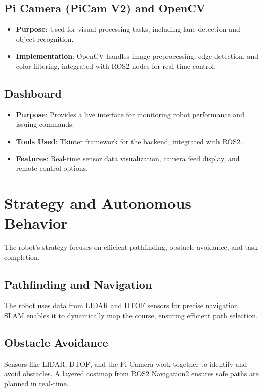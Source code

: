 \documentclass[12pt,a4paper]{article}
\begin{document}
\subsection{Pi Camera (PiCam V2) and OpenCV}
\begin{itemize}
    \item \textbf{Purpose}: Used for visual processing tasks, including lane detection and object recognition.
    \item \textbf{Implementation}: OpenCV handles image preprocessing, edge detection, and color filtering, integrated with ROS2 nodes for real-time control.
\end{itemize}

\subsection{Dashboard}
\begin{itemize}
    \item \textbf{Purpose}: Provides a live interface for monitoring robot performance and issuing commands.
    \item \textbf{Tools Used}: Tkinter framework for the backend, integrated with ROS2.
    \item \textbf{Features}: Real-time sensor data visualization, camera feed display, and remote control options.
\end{itemize}

\newpage

\section{Strategy and Autonomous Behavior}
The robot's strategy focuses on efficient pathfinding, obstacle avoidance, and task completion.

\subsection{Pathfinding and Navigation}
The robot uses data from LIDAR and DTOF sensors for precise navigation. SLAM enables it to dynamically map the course, ensuring efficient path selection.

\subsection{Obstacle Avoidance}
Sensors like LIDAR, DTOF, and the Pi Camera work together to identify and avoid obstacles. A layered costmap from ROS2 Navigation2 ensures safe paths are planned in real-time.
\end{document}
